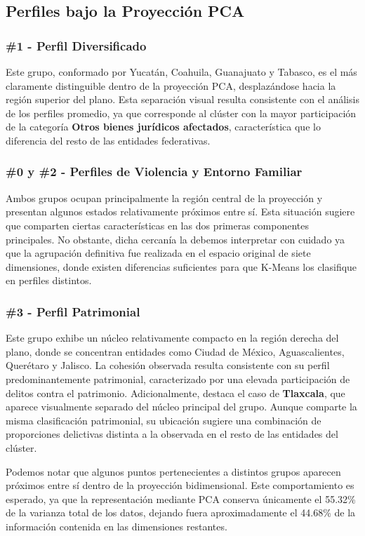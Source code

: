 \subsection{Perfiles bajo la Proyección PCA}

\subsubsection{\#1 - Perfil Diversificado}

Este grupo, conformado por Yucatán, Coahuila, Guanajuato y Tabasco, es el más claramente distinguible dentro de la
proyección PCA, desplazándose hacia la región superior del plano. Esta separación visual resulta consistente con el
análisis de los perfiles promedio, ya que corresponde al clúster con la mayor participación de la categoría \textbf{Otros
bienes jurídicos afectados}, característica que lo diferencia del resto de las entidades federativas.

\subsubsection{\#0 y \#2 - Perfiles de Violencia y Entorno Familiar}

Ambos grupos ocupan principalmente la región central de la proyección y presentan algunos estados relativamente próximos
entre sí. Esta situación sugiere que comparten ciertas características en las dos primeras componentes principales. No
obstante, dicha cercanía la debemos interpretar con cuidado ya que la agrupación definitiva fue realizada en el espacio
original de siete dimensiones, donde existen diferencias suficientes para que K-Means los clasifique en perfiles distintos.

\subsubsection{\#3 - Perfil Patrimonial}

Este grupo exhibe un núcleo relativamente compacto en la región derecha del plano, donde se concentran entidades como
Ciudad de México, Aguascalientes, Querétaro y Jalisco. La cohesión observada resulta consistente con su perfil
predominantemente patrimonial, caracterizado por una elevada participación de delitos contra el patrimonio. Adicionalmente,
destaca el caso de \textbf{Tlaxcala}, que aparece visualmente separado del núcleo principal del grupo. Aunque comparte la
misma clasificación patrimonial, su ubicación sugiere una combinación de proporciones delictivas distinta a la observada
en el resto de las entidades del clúster.

Podemos notar que algunos puntos pertenecientes a distintos grupos aparecen próximos entre sí dentro de la proyección
bidimensional. Este comportamiento es esperado, ya que la representación mediante PCA conserva únicamente el 55.32\% de
la varianza total de los datos, dejando fuera aproximadamente el 44.68\% de la información contenida en las dimensiones
restantes.